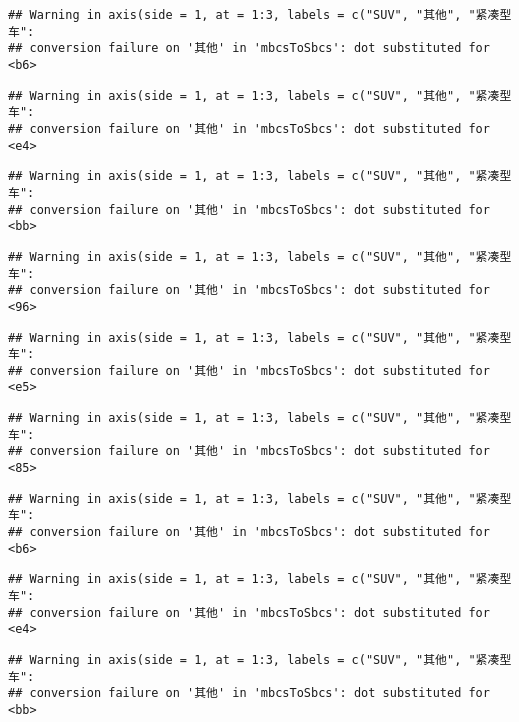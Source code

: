 \documentclass[]{article}
\begin{document}
\begin{verbatim}
## Warning in axis(side = 1, at = 1:3, labels = c("SUV", "其他", "紧凑型车":
## conversion failure on '其他' in 'mbcsToSbcs': dot substituted for <b6>
\end{verbatim}

\begin{verbatim}
## Warning in axis(side = 1, at = 1:3, labels = c("SUV", "其他", "紧凑型车":
## conversion failure on '其他' in 'mbcsToSbcs': dot substituted for <e4>
\end{verbatim}

\begin{verbatim}
## Warning in axis(side = 1, at = 1:3, labels = c("SUV", "其他", "紧凑型车":
## conversion failure on '其他' in 'mbcsToSbcs': dot substituted for <bb>
\end{verbatim}

\begin{verbatim}
## Warning in axis(side = 1, at = 1:3, labels = c("SUV", "其他", "紧凑型车":
## conversion failure on '其他' in 'mbcsToSbcs': dot substituted for <96>
\end{verbatim}

\begin{verbatim}
## Warning in axis(side = 1, at = 1:3, labels = c("SUV", "其他", "紧凑型车":
## conversion failure on '其他' in 'mbcsToSbcs': dot substituted for <e5>
\end{verbatim}

\begin{verbatim}
## Warning in axis(side = 1, at = 1:3, labels = c("SUV", "其他", "紧凑型车":
## conversion failure on '其他' in 'mbcsToSbcs': dot substituted for <85>
\end{verbatim}

\begin{verbatim}
## Warning in axis(side = 1, at = 1:3, labels = c("SUV", "其他", "紧凑型车":
## conversion failure on '其他' in 'mbcsToSbcs': dot substituted for <b6>
\end{verbatim}

\begin{verbatim}
## Warning in axis(side = 1, at = 1:3, labels = c("SUV", "其他", "紧凑型车":
## conversion failure on '其他' in 'mbcsToSbcs': dot substituted for <e4>
\end{verbatim}

\begin{verbatim}
## Warning in axis(side = 1, at = 1:3, labels = c("SUV", "其他", "紧凑型车":
## conversion failure on '其他' in 'mbcsToSbcs': dot substituted for <bb>
\end{verbatim}
\end{document}
